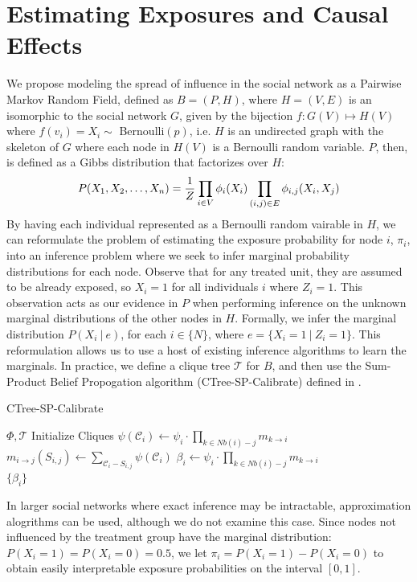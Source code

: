 \documentclass{article}
\begin{document}
\section{Estimating Exposures and Causal Effects}

We propose modeling the spread of influence in the social network as a Pairwise Markov Random Field, defined as $B = (P, H)$, where $H = (V, E)$ is an isomorphic to the social network $G$, given by the bijection $f: G(V) \mapsto H(V)$ where $f(v_i) = X_i \sim $ Bernoulli$(p)$, i.e. $H$ is an undirected graph with the skeleton of $G$ where each node in $H(V)$ is a Bernoulli random variable. 
$P$, then, is defined as a Gibbs distribution that factorizes over $H$: \\
\begin{displaymath}
  P(X_1, X_2, \dots, X_n) = \frac{1}{Z}\prod_{i \in V} \phi_i(X_i)\prod_{(i, j) \in E}\phi_{i,j}(X_i, X_j) \\[0.5ex]
\end{displaymath}
By having each individual represented as a Bernoulli random vairable in $H$, we can reformulate the problem of estimating the exposure probability for node $i$,  $\pi_i$, into 
an inference problem where we seek to infer marginal probability distributions for each node. Observe that for any treated unit, they are assumed to be already exposed, so $X_i = 1$ for all individuals $i$ where $Z_i = 1$. 
This observation acts as our evidence in $P$ when performing inference on the unknown marginal distributions of the other nodes in $H$. Formally, we infer the marginal distribution $P(X_i\ |\ e)$, for each $i \in \{N\}$, where $e = \{X_i = 1\ |\ Z_i = 1\}$. 
This reformulation allows us to use a host of existing inference algorithms to learn the marginals. In practice, we define a clique tree $\mathcal{T}$ for $B$, and then use the Sum-Product Belief Propogation algorithm (CTree-SP-Calibrate) defined in \cite{koller}. 
\begin{algorithm}[h]
  \caption{CTree-SP-Calibrate}
   \begin{algorithmic}[1]
       \Require $\Phi, \mathcal{T}$
       \State Initialize Cliques
       \State $\psi(\mathcal{C}_i) \leftarrow \psi_i \cdot \prod_{k \in Nb(i) - j}m_{k \rightarrow i}$
       \State $m_{i \rightarrow j}(S_{i,j}) \leftarrow \sum_{\mathcal{C}_i - S_{i,j}}\psi(\mathcal{C}_i)$
       \EndWhile
       \State $\beta_i \leftarrow \psi_i \cdot \prod_{k \in Nb(i) - j}m_{k \rightarrow i}$
       \EndFor \\

       \Return $\{\beta_i\}$
\end{algorithmic}
\end{algorithm}
In larger social networks where exact inference may be intractable, 
approximation alogrithms can be used, although we do not examine this case. Since nodes not influenced by the treatment group have the marginal distribution: $P(X_i = 1) = P(X_i = 0) = 0.5$, we let $\pi_i = P(X_i = 1) - P(X_i = 0)$ to obtain easily interpretable exposure probabilities on the interval $[0, 1]$.
\end{document}
